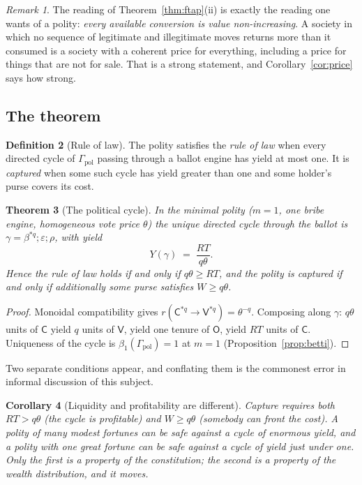 \documentclass[11pt]{article}
\theoremstyle{plain}
\newtheorem{theorem}{Theorem}[section]
\newtheorem{corollary}[theorem]{Corollary}
\theoremstyle{definition}
\newtheorem{definition}[theorem]{Definition}
\theoremstyle{remark}
\newtheorem{remark}[theorem]{Remark}
\newcommand{\bt}{\beta_1}
\newcommand{\Vt}{\mathsf{V}}
\newcommand{\Ct}{\mathsf{C}}
\newcommand{\Ot}{\mathsf{O}}
\begin{document}
\begin{remark}
The reading of Theorem~\ref{thm:ftap}(ii) is exactly the reading one wants of a
polity: \emph{every available conversion is value non-increasing}. A society in
which no sequence of legitimate and illegitimate moves returns more than it
consumed is a society with a coherent price for everything, including a price
for things that are not for sale. That is a strong statement, and
Corollary~\ref{cor:price} says how strong.
\end{remark}

\subsection{The theorem}

\begin{definition}[Rule of law]
\label{def:rol}
The polity satisfies the \emph{rule of law} when every directed cycle of
$\Gamma_{\mathrm{pol}}$ passing through a ballot engine has yield at most one.
It is \emph{captured} when some such cycle has yield greater than one and some
holder's purse covers its cost.
\end{definition}

\begin{theorem}[The political cycle]
\label{thm:cycle}
In the minimal polity ($m = 1$, one bribe engine, homogeneous vote price
$\theta$) the unique directed cycle through the ballot is
$\gamma = \beta^{\ast q};\varepsilon;\rho$, with yield
\[
  Y(\gamma) \;=\; \frac{RT}{q\theta}.
\]
Hence the rule of law holds if and only if $q\theta \ge RT$, and the polity is
captured if and only if additionally some purse satisfies $W \ge q\theta$.
\end{theorem}

\begin{proof}
Monoidal compatibility \cite[Def.~2.2]{vtok} gives
$r(\Ct^{\ast q}\to\Vt^{\ast q}) = \theta^{-q}$. Composing along $\gamma$:
$q\theta$ units of $\Ct$ yield $q$ units of $\Vt$, yield one tenure of $\Ot$,
yield $RT$ units of $\Ct$. Uniqueness of the cycle is
$\bt(\Gamma_{\mathrm{pol}}) = 1$ at $m=1$
(Proposition~\ref{prop:betti}).
\end{proof}

Two separate conditions appear, and conflating them is the commonest error in
informal discussion of this subject.

\begin{corollary}[Liquidity and profitability are different]
Capture requires both $RT > q\theta$ (the cycle is profitable) and
$W \ge q\theta$ (somebody can front the cost). A polity of many modest fortunes
can be safe against a cycle of enormous yield, and a polity with one great
fortune can be safe against a cycle of yield just under one. Only the first is
a property of the constitution; the second is a property of the wealth
distribution, and it moves.
\end{corollary}
\end{document}
